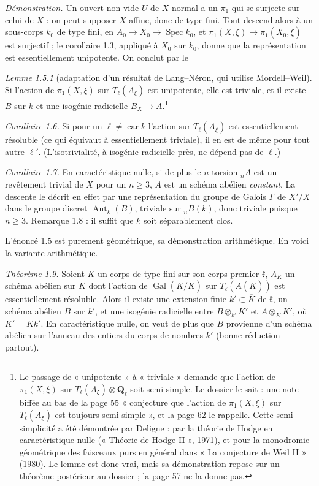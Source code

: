\documentclass[11pt,a4paper]{article}
\begin{document}
\emph{Démonstration.} Un ouvert non vide $U$ de $X$ normal a un $\pi_1$ qui
se surjecte sur celui de $X$ : on peut supposer $X$ affine, donc de type fini.
Tout descend alors à un sous-corps $k_0$ de type fini, en $A_0 \to X_0 \to
\operatorname{Spec} k_0$, et $\pi_1(X,\xi) \to \pi_1(\bar X_0, \xi)$ est
surjectif ; le corollaire 1.3, appliqué à $X_0$ sur $k_0$, donne que la
représentation est essentiellement unipotente. On conclut par le

\emph{Lemme 1.5.1} (adaptation d'un résultat de Lang--Néron, qui utilise
Mordell--Weil). Si l'action de $\pi_1(X,\xi)$ sur $T_\ell(A_\xi)$ est
unipotente, elle est triviale, et il existe $B$ sur $k$ et une isogénie
radicielle $B_X \to A$.\footnote{Le passage de « unipotente » à « triviale »
demande que l'action de $\pi_1(X,\xi)$ sur $T_\ell(A_\xi) \otimes \mathbf{Q}_\ell$
soit semi-simple. Le dossier le sait : une note biffée au bas de la page 55
« conjecture que l'action de $\pi_1(X,\xi)$ sur $T_\ell(A_\xi)$ est toujours
semi-simple », et la page 62 le rappelle. Cette semi-simplicité a été démontrée
par Deligne : par la théorie de Hodge en caractéristique nulle (« Théorie de
Hodge II », 1971), et pour la monodromie géométrique des faisceaux purs en
général dans « La conjecture de Weil II » (1980). Le lemme est donc vrai, mais
sa démonstration repose sur un théorème postérieur au dossier ; la page 57 ne
la donne pas.}

\emph{Corollaire 1.6.} Si pour un $\ell \neq \operatorname{car} k$ l'action sur
$T_\ell(A_\xi)$ est essentiellement résoluble (ce qui équivaut à
essentiellement triviale), il en est de même pour tout autre $\ell'$.
(L'isotrivialité, à isogénie radicielle près, ne dépend pas de $\ell$.)

\emph{Corollaire 1.7.} En caractéristique nulle, si de plus le $n$-torsion
${}_nA$ est un revêtement trivial de $X$ pour un $n \geq 3$, $A$ est un schéma
abélien \emph{constant}. La descente le décrit en effet par une représentation
du groupe de Galois $\Gamma$ de $X'/X$ dans le groupe discret
$\operatorname{Aut}_k(B)$, triviale sur ${}_nB(k)$, donc triviale puisque
$n \geq 3$. Remarque 1.8 : il suffit que $k$ soit séparablement clos.

L'énoncé 1.5 est purement géométrique, sa démonstration arithmétique. En voici
la variante arithmétique.

\emph{Théorème 1.9.} Soient $K$ un corps de type fini sur son corps premier
$\mathfrak{k}$, $A_K$ un schéma abélien sur $K$ dont l'action de
$\operatorname{Gal}(\overline K / K)$ sur $T_\ell(A(\overline K))$ est
essentiellement résoluble. Alors il existe une extension finie $k' \subset
\overline K$ de $\mathfrak{k}$, un schéma abélien $B$ sur $k'$, et une isogénie
radicielle entre $B \otimes_{k'} K'$ et $A \otimes_K K'$, où $K' = Kk'$. En
caractéristique nulle, on veut de plus que $B$ provienne d'un schéma abélien sur
l'anneau des entiers du corps de nombres $k'$ (bonne réduction partout).
\end{document}
